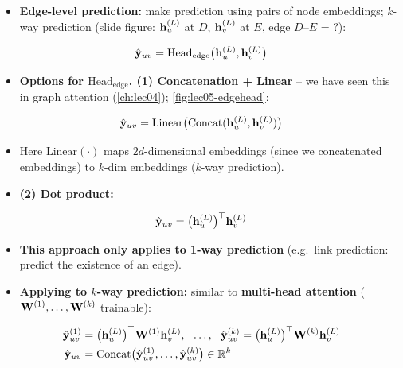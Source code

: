 \begin{itemize}
  \item \textbf{Edge-level prediction:} make prediction using pairs of node
    embeddings; $k$-way prediction (slide figure: $\mathbf{h}_u^{(L)}$ at $D$,
    $\mathbf{h}_v^{(L)}$ at $E$, edge $D$--$E$ = ?):
\end{itemize}
\begin{equation}\label{eq:lec05-headedge}
  \hat{\mathbf{y}}_{uv} = \mathrm{Head}_{\mathrm{edge}}\big(\mathbf{h}_u^{(L)},\mathbf{h}_v^{(L)}\big)
\end{equation}
\begin{itemize}
  \item \textbf{Options for $\mathrm{Head}_{\mathrm{edge}}$. (1) Concatenation
    + Linear} -- we have seen this in graph attention (\cref{ch:lec04});
    \cref{fig:lec05-edgehead}:
\end{itemize}
\begin{equation}\label{eq:lec05-concat}
  \hat{\mathbf{y}}_{uv} = \mathrm{Linear}\big(\mathrm{Concat}(\mathbf{h}_u^{(L)},\mathbf{h}_v^{(L)})\big)
\end{equation}
\begin{itemize}
  \item[] Here $\mathrm{Linear}(\cdot)$ maps $2d$-dimensional embeddings (since
    we concatenated embeddings) to $k$-dim embeddings ($k$-way prediction).
  \item \textbf{(2) Dot product:}
\end{itemize}
\begin{equation}\label{eq:lec05-dot}
  \hat{\mathbf{y}}_{uv} = \big(\mathbf{h}_u^{(L)}\big)^{\top}\mathbf{h}_v^{(L)}
\end{equation}
\begin{itemize}
  \item[] \textbf{This approach only applies to 1-way prediction} (e.g.\ link
    prediction: predict the existence of an edge).
  \item \textbf{Applying to $k$-way prediction:} similar to \textbf{multi-head
    attention} ($\mathbf{W}^{(1)},\dots,\mathbf{W}^{(k)}$ trainable):
\end{itemize}
\begin{align}
  \hat{\mathbf{y}}_{uv}^{(1)} &= \big(\mathbf{h}_u^{(L)}\big)^{\top}\mathbf{W}^{(1)}\mathbf{h}_v^{(L)},\ \
    \dots,\ \ \hat{\mathbf{y}}_{uv}^{(k)} = \big(\mathbf{h}_u^{(L)}\big)^{\top}\mathbf{W}^{(k)}\mathbf{h}_v^{(L)}
    \label{eq:lec05-dotk}\\
  \hat{\mathbf{y}}_{uv} &= \mathrm{Concat}\big(\hat{\mathbf{y}}_{uv}^{(1)},\dots,
    \hat{\mathbf{y}}_{uv}^{(k)}\big)\in\mathbb{R}^k \notag
\end{align}

